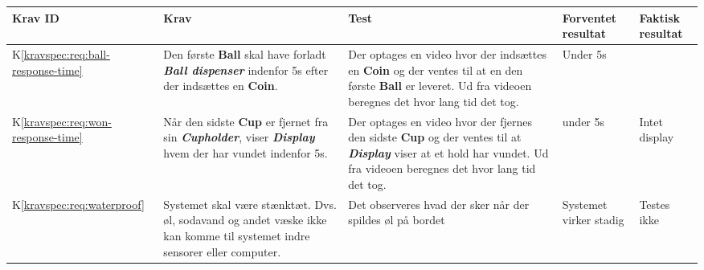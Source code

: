 \documentclass[Accepttestspecifikation/Accepttest_Main.tex]{subfiles}
\begin{document}
\begin{longtable}{|L{0.08\textwidth}|L{0.3\textwidth}|L{0.3\textwidth}|L{0.2\textwidth}|L{0.2\textwidth}|}
\hline
\textbf{Krav ID} & \textbf{Krav} & \textbf{Test} & \textbf{Forventet resultat} & \textbf{Faktisk resultat} \\ \hline

K\ref{kravspec:req:ball-response-time} & Den første \textbf{Ball} skal have forladt \textit{\textbf{Ball dispenser}} indenfor 5s efter der indsættes en \textbf{Coin}. & Der optages en video hvor der indsættes en \textbf{Coin} og der ventes til at en den første \textbf{Ball} er leveret. Ud fra videoen beregnes det hvor lang tid det tog.  & Under 5s & \\ \hline
K\ref{kravspec:req:won-response-time} & Når den sidste \textbf{Cup} er fjernet fra sin \textbf{\textit{Cupholder}}, viser \textbf{\textit{Display}} hvem der har vundet indenfor 5s. & Der optages en video hvor der fjernes den sidste \textbf{Cup} og der ventes til at \textbf{\textit{Display}} viser at et hold har vundet. Ud fra videoen beregnes det hvor lang tid det tog. & under 5s & Intet display\\ \hline
K\ref{kravspec:req:waterproof} & Systemet skal være stænktæt. Dvs. øl, sodavand og andet væske ikke kan komme til systemet indre sensorer eller computer. & Det observeres hvad der sker når der spildes øl på bordet & Systemet virker stadig & Testes ikke\\ \hline


\end{longtable}
\end{document}
